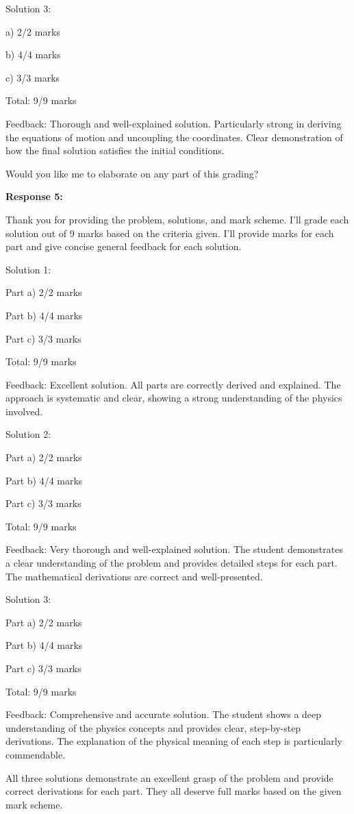 \documentclass[a4paper,11pt]{article}
\begin{document}
Solution 3:

a) 2/2 marks

b) 4/4 marks

c) 3/3 marks

Total: 9/9 marks

Feedback: Thorough and well-explained solution. Particularly strong in deriving the equations of motion and uncoupling the coordinates. Clear demonstration of how the final solution satisfies the initial conditions.

Would you like me to elaborate on any part of this grading?

\bigskip
\textbf{Response 5:}

Thank you for providing the problem, solutions, and mark scheme. I'll grade each solution out of 9 marks based on the criteria given. I'll provide marks for each part and give concise general feedback for each solution.

Solution 1:

Part a) 2/2 marks

Part b) 4/4 marks

Part c) 3/3 marks

Total: 9/9 marks

Feedback: Excellent solution. All parts are correctly derived and explained. The approach is systematic and clear, showing a strong understanding of the physics involved.

Solution 2:

Part a) 2/2 marks

Part b) 4/4 marks

Part c) 3/3 marks

Total: 9/9 marks

Feedback: Very thorough and well-explained solution. The student demonstrates a clear understanding of the problem and provides detailed steps for each part. The mathematical derivations are correct and well-presented.

Solution 3:

Part a) 2/2 marks

Part b) 4/4 marks

Part c) 3/3 marks

Total: 9/9 marks

Feedback: Comprehensive and accurate solution. The student shows a deep understanding of the physics concepts and provides clear, step-by-step derivations. The explanation of the physical meaning of each step is particularly commendable.

All three solutions demonstrate an excellent grasp of the problem and provide correct derivations for each part. They all deserve full marks based on the given mark scheme.
\end{document}

